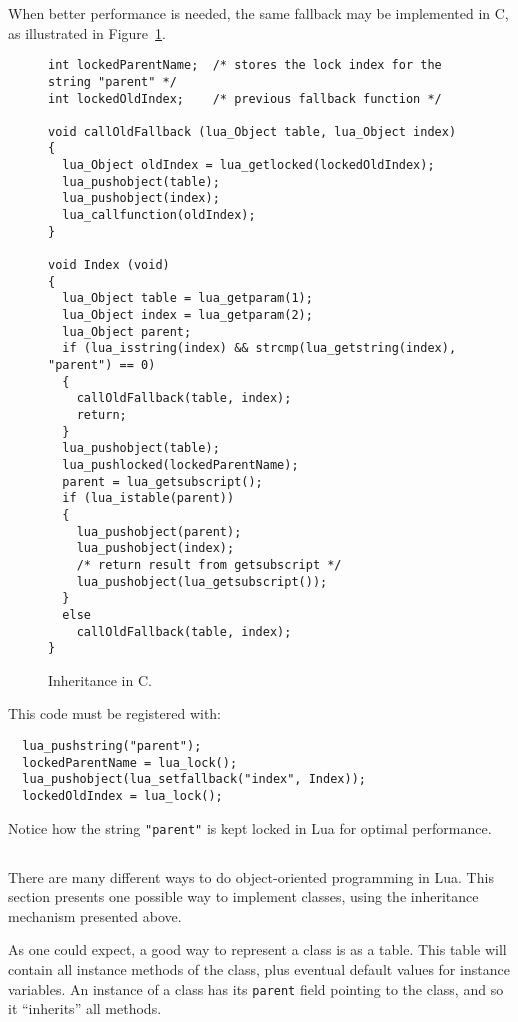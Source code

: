 When better performance is needed,
the same fallback may be implemented in C,
as illustrated in Figure~\ref{Cinher}.
\begin{figure}
\Line
\begin{verbatim}
int lockedParentName;  /* stores the lock index for the string "parent" */
int lockedOldIndex;    /* previous fallback function */

void callOldFallback (lua_Object table, lua_Object index)
{
  lua_Object oldIndex = lua_getlocked(lockedOldIndex);
  lua_pushobject(table);
  lua_pushobject(index);
  lua_callfunction(oldIndex);
}

void Index (void)
{
  lua_Object table = lua_getparam(1);
  lua_Object index = lua_getparam(2);
  lua_Object parent;
  if (lua_isstring(index) && strcmp(lua_getstring(index), "parent") == 0)
  {
    callOldFallback(table, index);
    return;
  }
  lua_pushobject(table);
  lua_pushlocked(lockedParentName);
  parent = lua_getsubscript();
  if (lua_istable(parent))
  {
    lua_pushobject(parent);
    lua_pushobject(index);
    /* return result from getsubscript */
    lua_pushobject(lua_getsubscript());
  }
  else
    callOldFallback(table, index);
}
\end{verbatim}
\caption{Inheritance in C.\label{Cinher}}
\Line
\end{figure}
This code must be registered with:
\begin{verbatim}
  lua_pushstring("parent");
  lockedParentName = lua_lock();
  lua_pushobject(lua_setfallback("index", Index));
  lockedOldIndex = lua_lock();
\end{verbatim}
Notice how the string \verb'"parent"' is kept
locked in Lua for optimal performance.

\subsection{}
There are many different ways to do object-oriented programming in Lua.
This section presents one possible way to
implement classes,
using the inheritance mechanism presented above.

As one could expect, a good way to represent a class is
as a table.
This table will contain all instance methods of the class,
plus eventual default values for instance variables.
An instance of a class has its \verb'parent' field pointing to
the class,
and so it ``inherits'' all methods.

